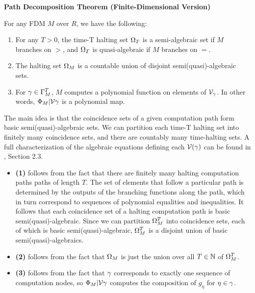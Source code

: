   \begin{theorem}{\textbf{Path Decomposition Theorem (Finite-Dimensional Version)}}
    
    For any FDM $M$ over $R$, we have the following:

    \begin{enumerate}
    \item For any $T > 0$, the time-T halting set $\Omega_T$ is a
      semi-algebraic set if $M$ branches on $>$, and $\Omega_T$ is
      quasi-algebraic if $M$ branches on $=$.

    \item The halting set $\Omega_M$ is a countable union of
      disjoint semi(quasi)-algebraic sets.

    \item For $\gamma \in \Gamma_M^T$, $M$ computes a
      polynomial function on elements of $\mathcal{V}_\gamma$.
      In other words, $\Phi_M|\mathcal{V}{\gamma}$ is a
      polynomial map.
    \end{enumerate}
    
    \label{thm:pdt-finite}
  \end{theorem}

  \begin{proofsketch}
    
    The main idea is that the coincidence sets of a given computation
    path form basic semi(quasi)-algebraic sets.  We can partition each
    time-T halting set into finitely many coincidence sets, and there
    are countably many time-halting sets.  A full characterization of
    the algebraic equations defining each $\mathcal{V}(\gamma)$
    can be found in \cite{B98}, Section 2.3.

    \begin{itemize}
    \item \textbf{(1)} follows from the fact that there are finitely
      many halting computation paths paths of length $T$.  The set of
      elements that follow a particular path is determined by the
      outputs of the branching functions along the path, which in turn
      correspond to sequences of polynomial equalities and
      inequalities.  It follows that each coincidence set of a halting
      computation path is basic semi(quasi)-algebraic. Since we can
      partition $\Omega_M^T$ into coincidence sets, each of which is
      basic semi(quasi)-algebraic, $\Omega_M^T$ is a disjoint union
      of basic semi(quasi)-algebraics.
    \item \textbf{(2)} follows from the fact that $\Omega_M$ is just
      the union over all $T \in \mathbb{N}$ of $\Omega_M^T$.
    \item \textbf{(3)} follows from the fact that $\gamma$
      corresponds to exactly one sequence of computation nodes, so
      $\Phi_M|\mathcal{V}{\gamma}$ computes the
      composition of $g_{\eta}$ for $\eta \in \gamma$.
    \end{itemize}
  \end{proofsketch}
  
